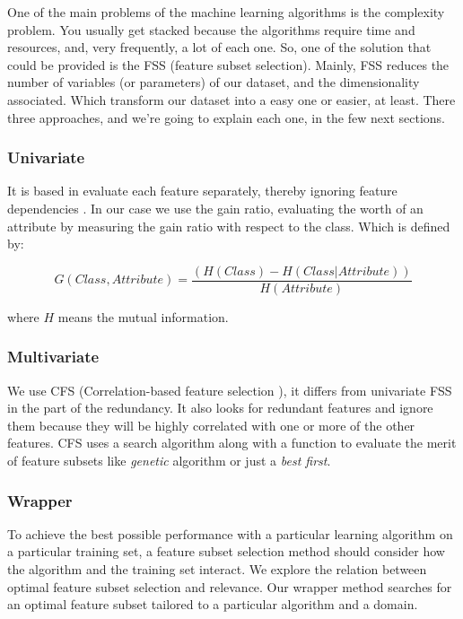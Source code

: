 \documentclass[conference,a4paper]{IEEEtran}
\begin{document}
One of the main problems of the machine learning algorithms is the complexity problem. You usually get stacked because the algorithms require time and resources, and, very frequently, a lot of each one. So, one of the solution that could be provided is the FSS (feature subset selection). Mainly, FSS reduces the number of variables (or parameters) of our dataset, and the dimensionality associated. Which transform our dataset into a easy one or easier, at least. There three approaches, and we're going to explain each one, in the few next sections.

\subsubsection{Univariate}

It is based in evaluate each feature separately, thereby ignoring feature dependencies \cite{Univariate}. In our case we use the gain ratio, evaluating the worth of an attribute by measuring the gain ratio with respect to the class. Which is defined by:

\begin{equation}
	G(Class, Attribute) = \frac{(H(Class) - H(Class | Attribute))}{H(Attribute)}
\end{equation}

where $H$ means the mutual information.

\subsubsection{Multivariate}

We use CFS (Correlation-based feature selection \cite{CFS}), it differs from univariate FSS in the part of the redundancy. It also looks for redundant features and ignore them because they will be highly correlated with one or more of the other features. CFS uses a search algorithm along with a function to evaluate the merit of feature subsets like \emph{genetic} algorithm or just a \emph{best first}.

\subsubsection{Wrapper \cite{Wrapper}}

To achieve the best possible performance with a particular learning algorithm on a particular training set, a feature subset selection method should consider how the algorithm and the training set interact. We explore the relation between optimal feature subset selection and relevance. Our wrapper method searches for an optimal feature subset tailored to a particular algorithm and a domain. 
\end{document}
